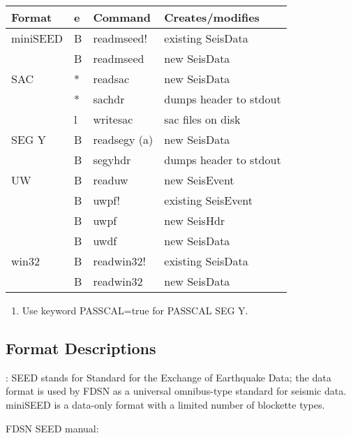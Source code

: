 \documentclass[letterpaper,11pt,english]{sphinxmanual}
\begin{document}
\begin{savenotes}\sphinxattablestart
\centering
\begin{tabulary}{\linewidth}[t]{|T|T|T|T|}
\hline
\sphinxstyletheadfamily 
Format
&\sphinxstyletheadfamily 
e
&\sphinxstyletheadfamily 
Command
&\sphinxstyletheadfamily 
Creates/modifies
\\
\hline
miniSEED
&
B
&
readmseed!
&
existing SeisData
\\
\hline&
B
&
readmseed
&
new SeisData
\\
\hline
SAC
&
*
&
readsac
&
new SeisData
\\
\hline&
*
&
sachdr
&
dumps header to stdout
\\
\hline&
l
&
writesac
&
sac files on disk
\\
\hline
SEG Y
&
B
&
readsegy (a)
&
new SeisData
\\
\hline&
B
&
segyhdr
&
dumps header to stdout
\\
\hline
UW
&
B
&
readuw
&
new SeisEvent
\\
\hline&
B
&
uwpf!
&
existing SeisEvent
\\
\hline&
B
&
uwpf
&
new SeisHdr
\\
\hline&
B
&
uwdf
&
new SeisData
\\
\hline
win32
&
B
&
readwin32!
&
existing SeisData
\\
\hline&
B
&
readwin32
&
new SeisData
\\
\hline
\end{tabulary}
\par
\sphinxattableend\end{savenotes}
\begin{enumerate}
\def\theenumi{\alph{enumi}}
\def\labelenumi{(\theenumi )}
\makeatletter\def\p@enumii{\p@enumi (\theenumi )}\makeatother
\item {} 
Use keyword PASSCAL=true for PASSCAL SEG Y.

\end{enumerate}


\subsection{Format Descriptions}
\label{\detokenize{src/Formats/fileformats:format-descriptions}}
: SEED stands for Standard for the Exchange of Earthquake Data; the data format is used by FDSN as a universal omnibus-type standard for seismic data. miniSEED is a data-only format with a limited number of blockette types. %
\begin{footnote}[1]\sphinxAtStartFootnote
FDSN SEED manual: 
%
\end{footnote}
\end{document}
